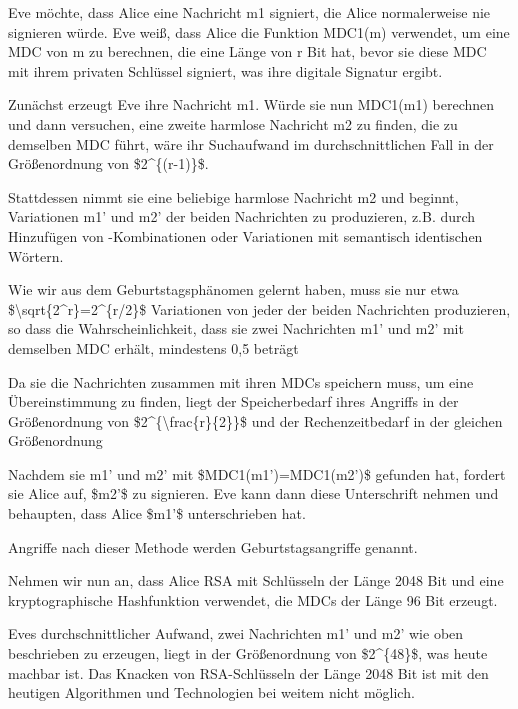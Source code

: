 \documentclass[a4paper]{article}
\begin{document}
\begin{multicols}{3}
\begin{itemize*}
\begin{itemize*}
                  \item Eve möchte, dass Alice eine Nachricht m1 signiert, die Alice normalerweise nie signieren würde. Eve weiß, dass Alice die Funktion MDC1(m) verwendet, um eine MDC von m zu berechnen, die eine Länge von r Bit hat, bevor sie diese MDC mit ihrem privaten Schlüssel signiert, was ihre digitale Signatur ergibt.
                  \item Zunächst erzeugt Eve ihre Nachricht m1. Würde sie nun MDC1(m1) berechnen und dann versuchen, eine zweite harmlose Nachricht m2 zu finden, die zu demselben MDC führt, wäre ihr Suchaufwand im durchschnittlichen Fall in der Größenordnung von \$2\^{}\{(r-1)\}\$.
                  \item Stattdessen nimmt sie eine beliebige harmlose Nachricht m2 und beginnt, Variationen m1' und m2' der beiden Nachrichten zu produzieren, z.B. durch Hinzufügen von -Kombinationen oder Variationen mit semantisch identischen Wörtern.
            \end{itemize*}
            \item Wie wir aus dem Geburtstagsphänomen gelernt haben, muss sie nur etwa
            \$\textbackslash sqrt\{2\^{}r\}=2\^{}\{r/2\}\$ Variationen von jeder
            der beiden Nachrichten produzieren, so dass die Wahrscheinlichkeit,
            dass sie zwei Nachrichten m1' und m2' mit demselben MDC erhält,
            mindestens 0,5 beträgt
            \item Da sie die Nachrichten zusammen mit ihren MDCs speichern muss, um eine
            Übereinstimmung zu finden, liegt der Speicherbedarf ihres Angriffs in
            der Größenordnung von \$2\^{}\{\textbackslash frac\{r\}\{2\}\}\$ und
            der Rechenzeitbedarf in der gleichen Größenordnung
            \item Nachdem sie m1' und m2' mit \$MDC1(m1')=MDC1(m2')\$ gefunden hat,
            fordert sie Alice auf, \$m2'\$ zu signieren. Eve kann dann diese
            Unterschrift nehmen und behaupten, dass Alice \$m1'\$ unterschrieben
            hat.
            \item Angriffe nach dieser Methode werden Geburtstagsangriffe genannt.
            \item Nehmen wir nun an, dass Alice RSA mit Schlüsseln der Länge 2048 Bit
            und eine kryptographische Hashfunktion verwendet, die MDCs der Länge
            96 Bit erzeugt.
            \begin{itemize*}
                  \item Eves durchschnittlicher Aufwand, zwei Nachrichten m1' und m2' wie oben beschrieben zu erzeugen, liegt in der Größenordnung von \$2\^{}\{48\}\$, was heute machbar ist. Das Knacken von RSA-Schlüsseln der Länge 2048 Bit ist mit den heutigen Algorithmen und Technologien bei weitem nicht möglich.
            \end{itemize*}
      \end{itemize*}



\end{multicols}
\end{document}

